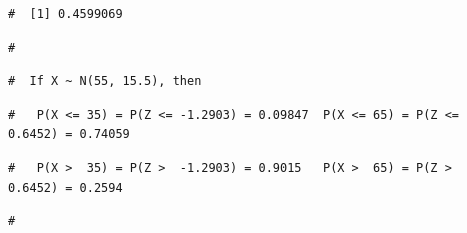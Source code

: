 \documentclass[letterpaper,12pt,twoside,]{pinp}
\begin{document}
\begin{Shaded}
\begin{Highlighting}[]
\NormalTok{(} \NormalTok{, } \NormalTok{, } \NormalTok{) }\OperatorTok{-}\StringTok{ }\NormalTok{(} \NormalTok{, } \NormalTok{, } \NormalTok{)}
\end{Highlighting}
\end{Shaded}

\begin{ShadedResult}
\begin{verbatim}
#  [1] 0.4599069
\end{verbatim}
\end{ShadedResult}

\begin{Shaded}
\begin{Highlighting}[]
\OperatorTok{::}\NormalTok{(} \NormalTok{(}\NormalTok{,}\NormalTok{), } \NormalTok{, } \NormalTok{)}
\end{Highlighting}
\end{Shaded}

\begin{ShadedResult}
\begin{verbatim}
#  
\end{verbatim}
\end{ShadedResult}
\begin{ShadedResult}
\begin{verbatim}
#  If X ~ N(55, 15.5), then
\end{verbatim}
\end{ShadedResult}
\begin{ShadedResult}
\begin{verbatim}
#   P(X <= 35) = P(Z <= -1.2903) = 0.09847  P(X <= 65) = P(Z <=  0.6452) = 0.74059
\end{verbatim}
\end{ShadedResult}
\begin{ShadedResult}
\begin{verbatim}
#   P(X >  35) = P(Z >  -1.2903) = 0.9015   P(X >  65) = P(Z >   0.6452) = 0.2594
\end{verbatim}
\end{ShadedResult}
\begin{ShadedResult}
\begin{verbatim}
#  
\end{verbatim}
\end{ShadedResult}
\end{document}
